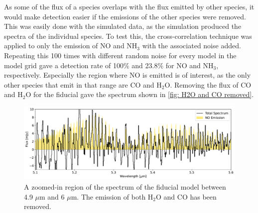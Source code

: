 \documentclass[twoside, single, authoryear, semicolon, 12pt]{lion-msc}
\newcommand{\4}{$_4$}
\newcommand{\3}{$_3$}
\newcommand{\2}{$_2$}
\begin{document}

As some of the flux of a species overlaps with the flux emitted by other species, it would make detection easier if the emissions of the other species were removed. This was easily done with the simulated data, as the simulation produced the spectra of the individual species. To test this, the cross-correlation technique was applied to only the emission of NO and NH\3 with the associated noise added. Repeating this 100 times with different random noise for every model in the model grid gave a detection rate of 100\% and 23.8\% for NO and NH\3, respectively.  Especially the region where NO is emitted is of interest, as the only other species that emit in that range are CO and H\2O. Removing the flux of CO and H\2O for the fiducial gave the spectrum shown in \autoref{fig: H2O and CO removed}.

\begin{figure}[H]
    \centering
    \includegraphics[width=\linewidth]{Figures/H2O_CO_removed.pdf}
    \caption{A zoomed-in region of the spectrum of the fiducial model between 4.9 $\mu$m and 6 $\mu$m. The emission of both H\2O and CO has been removed.}
    \label{fig: H2O and CO removed}
\end{figure}
\end{document}
